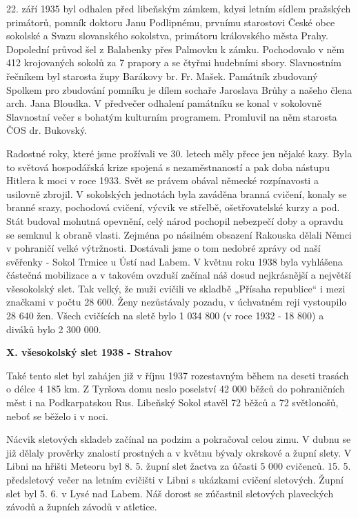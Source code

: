 22. září 1935 byl odhalen před libeňským zámkem, kdysi letním sídlem
pražských primátorů, pomník doktoru Janu Podlipnému, prvnímu starostovi
České obce sokolské a Svazu slovanského sokolstva, primátoru královského
města Prahy. Dopolední průvod šel z Balabenky přes Palmovku k zámku.
Pochodovalo v něm 412 krojovaných sokolů za 7 prapory a se čtyřmi
hudebními sbory. Slavnostním řečníkem byl starosta župy Barákovy br. Fr.
Mašek. Památník zbudovaný Spolkem pro zbudování pomníku je dílem sochaře
Jaroslava Brůhy a našeho člena arch. Jana Bloudka. V předvečer odhalení
památníku se konal v sokolovně Slavnostní večer s bohatým kulturním
programem. Promluvil na něm starosta ČOS dr. Bukovský.

Radostné roky, které jsme prožívali ve 30. letech měly přece jen nějaké
kazy. Byla to světová hospodářská krize spojená s nezaměstnaností a pak
doba nástupu Hitlera k moci v roce 1933. Svět se právem obával německé
rozpínavosti a usilovně zbrojil. V sokolských jednotách byla zaváděna
branná cvičení, konaly se branné srazy, pochodová cvičení, výcvik ve
střelbě, ošetřovatelské kurzy a pod. Stát budoval mohutná opevnění, celý
národ pochopil nebezpečí doby a opravdu se semknul k obraně vlasti.
Zejména po násilném obsazení Rakouska dělali Němci v pohraničí velké
výtržnosti. Dostávali jsme o tom nedobré zprávy od naší svěřenky - Sokol
Trmice u Ústí nad Labem. V květnu roku 1938 byla vyhlášena částečná
mobilizace a v takovém ovzduší začínal náš dosud nejkrásnější a největší
všesokolský slet. Tak velký, že muži cvičili ve skladbě „Přísaha
republice`` i mezi značkami v počtu 28 600. Ženy nezůstávaly pozadu, v
úchvatném reji vystoupilo 28 640 žen. Všech cvičících na sletě bylo 1
034 800 (v roce 1932 - 18 800) a diváků bylo 2 300 000.

\textbf{X. všesokolský slet 1938 - Strahov}

Také tento slet byl zahájen již v říjnu 1937 rozestavným během na deseti
trasách o délce 4 185 km. Z Tyršova domu neslo poselství 42 000 běžců do
pohraničních měst i na Podkarpatskou Rus. Libeňský Sokol stavěl 72 běžců
a 72 světlonošů, neboť se běželo i v noci.

Nácvik sletových skladeb začínal na podzim a pokračoval celou zimu. V
dubnu se již dělaly prověrky znalostí prostných a v květnu bývaly
okrskové a župní slety. V Libni na hřišti Meteoru byl 8. 5. župní slet
žactva za účasti 5 000 cvičenců. 15. 5. předsletový večer na letním
cvičišti v Libni s ukázkami cvičení sletových. Župní slet byl 5. 6. v
Lysé nad Labem. Náš dorost se zúčastnil sletových plaveckých závodů a
župních závodů v atletice.

